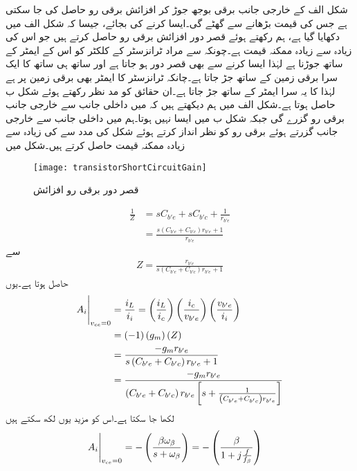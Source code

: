 شکل  الف کے خارجی جانب برقی بوجھ  جوڑ کر افزائش برقی رو  حاصل کی جا سکتی ہے جس کی قیمت  بڑھانے سے گھٹے گی۔ایسا کرنے کی بجائے، جیسا کہ شکل  الف میں دکھایا گیا ہے، ہم  رکھتے ہوئے قصر دور افزائش برقی رو  حاصل کرتے ہیں جو اس کی زیادہ سے زیادہ ممکنہ قیمت ہے۔چونکہ  سے مراد ٹرانزسٹر کے  کلکٹر  کو اس کے ایمٹر    کے ساتھ جوڑنا ہے لہٰذا ایسا کرنے سے  بھی قصر دور ہو جاتا ہے اور ساتھ ہی ساتھ  کا ایک سرا  برقی زمین کے ساتھ جڑ جاتا ہے۔چانکہ ٹرانزسٹر کا ایمٹر    بھی برقی زمین پر ہے لہٰذا  کا یہ سرا ایمٹر    کے ساتھ جڑ جاتا ہے۔ان حقائق کو مد نظر رکھتے ہوئے شکل  ب حاصل ہوتا ہے۔شکل  الف میں ہم دیکھتے ہیں کہ  میں داخلی جانب سے خارجی جانب برقی رو گزرے گی جبکہ شکل  ب میں ایسا نہیں ہوتا۔ہم  میں داخلی جانب سے خارجی جانب گزرتے ہوئے برقی رو کو نظر انداز کرتے ہوئے شکل  کی مدد سے   کی زیادہ سے زیادہ ممکنہ قیمت حاصل کرتے ہیں۔شکل میں
\begin{figure}
\centering
\texttt{[image: transistorShortCircuitGain]}
\caption{قصر دور برقی رو افزائش}
\label{شکل_تعددی_ردعمل_کسر_دور_افزائش}
\end{figure}
%
\begin{align*}
\frac{1}{Z}&=sC_{b'e}+s C_{b'c}+\frac{1}{r_{b'e}}\\
&=\frac{s\left(C_{b'e}+C_{b'c} \right ) r_{b'e}+1}{r_{b'e}}
\end{align*}
سے
\begin{align*}
Z=\frac{r_{b'e}}{s\left(C_{b'e}+C_{b'c} \right ) r_{b'e}+1}
\end{align*}
حاصل ہوتا ہے۔یوں
\begin{align*}
\eval {A_i}_{v_{ce}=0}&=\frac{i_L}{i_i}=\left(\frac{i_L}{i_c}\right) \left(\frac{i_c}{v_{b'e}}\right) \left(\frac{v_{b'e}}{i_i}\right)\\
&=\left(-1 \right) \left(g_m \right) \left( Z \right)\\
&=\frac{-g_m r_{b'e}}{s\left(C_{b'e}+C_{b'c} \right ) r_{b'e}+1}\\
&=\frac{-g_m r_{b'e}}{\left(C_{b'e}+C_{b'c} \right) r_{b'e} \left[ s+\frac{1}{\left(C_{b'e}+C_{b'c} \right) r_{b'e}} \right]}
\end{align*}
لکھا جا سکتا ہے۔اس کو مزید یوں لکھ سکتے ہیں
\begin{gather}
\begin{aligned} \label{مساوات_تعددی_ردعمل_کسر_دور_افزائش}
\eval {A_i}_{v_{ce}=0}&= -\left(\frac{\beta \omega_{\beta} }{ s+\omega_{\beta}} \right)=-\left(\frac{\beta }{1+ j \frac{f}{f_{\beta}}} \right)
\end{aligned}
\end{gather}
